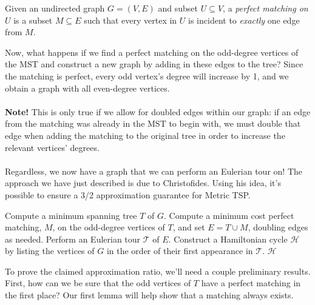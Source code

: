 \documentclass{article}
\newenvironment{definition}[2][Definition]{\begin{trivlist}
\item[\hskip \labelsep {\bfseries #1}\hskip \labelsep {\hspace{-1ex}\bfseries #2.}]}{\end{trivlist}}
\begin{document}
\begin{definition}{ (Perfect Matching)}{}
    Given an undirected graph $G = (V,E)$ and subset $U \subseteq V$, a \textit{perfect matching on $U$} is a subset $M \subseteq E$ such that every vertex in $U$ is incident to \textit{exactly} one edge from $M$.
\end{definition}

\noindent Now, what happens if we find a perfect matching on the odd-degree vertices of the MST and construct a new graph by adding in these edges to the tree? Since the matching is perfect, every odd vertex's degree will increase by 1, and we obtain a graph with all even-degree vertices.\\
\\
\textbf{Note!} This is only true if we allow for doubled edges within our graph: if an edge from the matching was already in the MST to begin with, we must double that edge when adding the matching to the original tree in order to increase the relevant vertices' degrees.\\
\\
Regardless, we now have a graph that we can perform an Eulerian tour on! The approach we have just described is due to  Christofides. Using his idea, it's possible to ensure a 3/2 approximation guarantee for Metric TSP.

\begin{algorithm}
    \renewcommand{\thealgorithm}{}
    \caption{\textsc{Christofides-TSP}$(G,c)$}
    \begin{algorithmic}[1]
        \State Compute a minimum spanning tree $T$ of $G$.
        \State Compute a minimum cost perfect matching, $M$, on the odd-degree vertices of $T$, and set $E = T \cup M$, doubling edges as needed.
        \State Perform an Eulerian tour $\mathcal{T}$ of $E$.
        \State Construct a Hamiltonian cycle $\mathcal{H}$ by listing the vertices of $G$ in the order of their first appearance in $\mathcal{T}$.
        \State \Return $\mathcal{H}$
    \end{algorithmic}
\end{algorithm}

\noindent To prove the claimed approximation ratio, we'll need a couple preliminary results. First, how can we be sure that the odd vertices of $T$ have a perfect matching in the first place? Our first lemma will help show that a matching always exists. 
\end{document}
